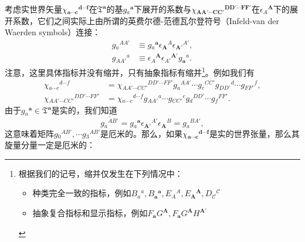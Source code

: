 考虑实世界矢量$\chi {_{\boldsymbol{a} \cdots \boldsymbol{c}}}^{\boldsymbol{d} \cdots \boldsymbol{f}}$在$\mathfrak{T}^{\boldsymbol{a}}$的基$g{_{a}}^{\boldsymbol{a}}$下展开的系数与$\chi {_{\boldsymbol{AA} '\cdots \boldsymbol{CC} '}}^{\boldsymbol{DD} '\cdots \boldsymbol{FF} '}$在$\epsilon {_{A}}^{\boldsymbol{A}}$下的展开系数，它们之间实际上由所谓的英费尔德-范德瓦尔登符号（Infeld-van der Waerden symbols）连接：
\begin{equation*}
	\begin{aligned}
		g{_{a}}^{AA'} & \equiv g{_{a}}^{\boldsymbol{a}} \epsilon {_{\boldsymbol{A}}}^{A} \epsilon {_{\boldsymbol{A} '}}^{A'} ,\\
		g{_{AA'}}^{a} & \equiv \epsilon {_{A}}^{\boldsymbol{A}} \epsilon {_{A'}}^{\boldsymbol{A} '} g{_{\boldsymbol{a}}}^{a} .
	\end{aligned}
\end{equation*}
注意，这里具体指标并没有缩并，只有抽象指标有缩并\footnote{根据我们的记号，缩并仅发生在下列情况中：
	\begin{itemize}
		\item 种类完全一致的指标，例如$B{_{a}}^{a} ,B{_{\boldsymbol{a}}}^{\boldsymbol{a}} ,E{_{A}}^{A} ,E{_{\boldsymbol{A}}}^{\boldsymbol{A}} ,D{_{\mathcal{C}}}^{\mathcal{C}}$
		\item 抽象复合指标和显示指标，例如$F_{\boldsymbol{a}} G^{\boldsymbol{A}} ,F_{\boldsymbol{a}} G^{\boldsymbol{A}} H^{\boldsymbol{A} '}$
\end{itemize}}。例如我们有
\begin{equation*}
	\begin{aligned}
		\chi {_{a\cdots c}}^{d\cdots f} & =\chi {_{AA'\cdots CC'}}^{DD'\cdots FF'} g{_{a}}^{AA'} \cdots g{_{c}}^{CC'} g{_{DD'}}^{d} \cdots g{_{FF'}}^{f} ,\\
		\chi {_{AA'\cdots CC'}}^{DD'\cdots FF'} & =\chi {_{a\cdots c}}^{d\cdots f} g{_{AA'}}^{a} \cdots g{_{CC'}}^{c} g{_{d}}^{DD'} \cdots g{_{f}}^{FF'} .
	\end{aligned}
\end{equation*}
由于$g{_{a}}^{\boldsymbol{a}} \in \mathfrak{T}^{\boldsymbol{a}}$是实的，我们知道
\begin{equation*}
	\overline{g{_{a}}^{AB'}} =g{_{a}}^{\boldsymbol{a}} \epsilon {_{\boldsymbol{A} '}}^{A'} \epsilon {_{\boldsymbol{A}}}^{B} =g{_{a}}^{BA'} ,
\end{equation*}
这意味着矩阵$g{_{0}}^{AB'} ,\cdots g{_{3}}^{AB'}$是厄米的。那么，如果$\chi {_{\boldsymbol{a} \cdots \boldsymbol{c}}}^{\boldsymbol{d} \cdots \boldsymbol{f}}$是实的世界张量，那么其旋量分量一定是厄米的：
